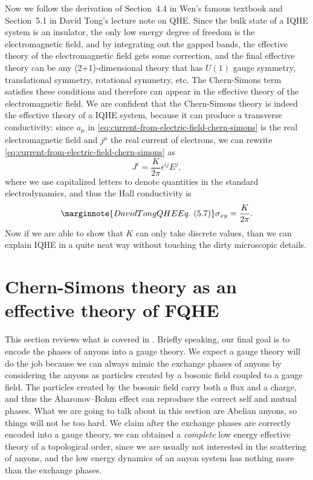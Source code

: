 \documentclass[hyperref, a4paper]{article}
\begin{document}
Now we follow the derivation of Section~4.4 in Wen's famous textbook and Section~5.1 in David Tong's lecture 
note on QHE. 
Since the bulk state of a IQHE system is an insulator, the only low energy degree of freedom is the electromagnetic 
field, and by integrating out the gapped bands, the effective theory of the electromagnetic field gets some 
correction, and the final effective theory can be any (2+1)-dimensional theory that has $U(1)$ gauge 
symmetry, translational symmetry, rotational symmetry, etc. The Chern-Simons term satisfies these 
conditions and therefore can appear in the effective theory of the electromagnetic field. We are 
confident that the Chern-Simons theory is indeed the effective theory of a IQHE system, because it 
can produce a transverse conductivity: since $a_\mu$ in \eqref{eq:current-from-electric-field-chern-simons} is 
the real electromagnetic field and $j^\mu$ the real current of electrons, we can rewrite 
\eqref{eq:current-from-electric-field-chern-simons} 
as 
\begin{equation}
    J^i = \frac{K}{2\pi} \epsilon^{ij} E^j,
\end{equation}
where we use capitalized letters to denote quantities in the standard electrodynamics,
and thus the Hall conductivity is 
\begin{equation} \marginnote{David Tong QHE Eq.~(5.7)}
    \sigma_{xy} = \frac{K}{2\pi}. 
\end{equation}
Now if we are able to show that $K$ can only take discrete values, than we can explain IQHE in a quite 
neat way without touching the dirty microscopic details.



\section{Chern-Simons theory as an effective theory of FQHE}

This section reviews what is covered in \cite{viefers_anyons}.
Briefly speaking, our final goal is to encode the phases of anyons into a gauge theory.
We expect a gauge theory will do the job because we can always mimic the exchange phases of anyons 
by considering the anyons as particles created by a bosonic field coupled to a gauge field.
The particles created by the bosonic field carry both a flux and a charge, 
and thus the Aharonov–Bohm effect can reproduce the correct self and mutual phases. 
What we are going to talk about in this section are Abelian anyons, so things will not be too hard.
We claim after the exchange phases are correctly encoded into a gauge theory, 
we can obtained a \emph{complete} low energy effective theory of a topological order,
since we are usually not interested in the scattering of anyons, and the low energy dynamics of an 
anyon system has nothing more than the exchange phases.
\end{document}
